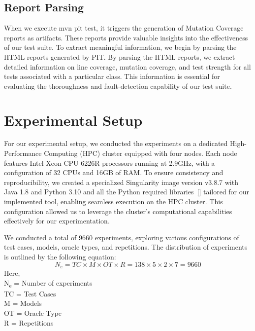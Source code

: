 \vspace{0.1 cm}
\subsection{Report Parsing}
\label{sec:report_parsing}
\vspace{0.1 cm}

When we execute mvn pit test, it triggers the generation of Mutation Coverage reports as artifacts. These reports provide valuable insights into the effectiveness of our test suite. To extract meaningful information, we begin by parsing the HTML reports generated by PIT. By parsing the HTML reports, we extract detailed information on line coverage, mutation coverage, and test strength for all tests associated with a particular class. This information is essential for evaluating the thoroughness and fault-detection capability of our test suite.

\section{Experimental Setup}
\label{sec:experimental_setup}
\vspace{0.2 cm}

For our experimental setup, we conducted the experiments on a dedicated High-Performance Computing (HPC) cluster equipped with four nodes. Each node features Intel Xeon CPU 6226R\cite{noauthor_intel_nodate} processors running at 2.9GHz, with a configuration of 32 CPUs and 16GB of RAM. To ensure consistency and reproducibility, we created a specialized Singularity\cite{noauthor_introduction_nodate} image version v3.8.7\cite{noauthor_singularity_releases_nodate} with Java 1.8 and Python 3.10 and all the Python required libraries~\ref{} tailored for our implemented tool, enabling seamless execution on the HPC cluster. This configuration allowed us to leverage the cluster's computational capabilities effectively for our experimentation.

We conducted a total of 9660 experiments, exploring various configurations of test cases, models, oracle types, and repetitions. The distribution of experiments is outlined by the following equation:
\[
N_e = TC \times M \times OT \times R = 138 \times 5 \times 2 \times 7 = 9660
\]
Here, \\
N\textsubscript{e} = Number of experiments\\
TC = Test Cases\\
M = Models\\
OT = Oracle Type\\
R = Repetitions\\

